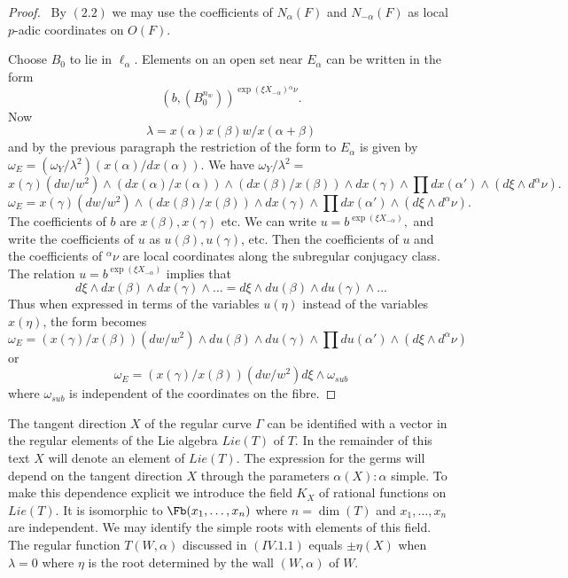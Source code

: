 \documentclass{memo-l}
\theoremstyle{definition}
\theoremstyle{remark}
\numberwithin{section}{chapter}
\numberwithin{equation}{chapter}
\begin{document}
\begin{proof} \ By $(2.2)$ we may use the coefficients of
$N_{{\alpha}}(F)$ and $N_{-{\alpha}}(F)$ as local $p$-adic coordinates on
$O(F)$.

   Choose $B_{0}$ to lie in ${\ell}_{{\alpha}}$.  Elements on an open set
near $E_{{\alpha}}$ can be written in the form 
$$(b,(B_{0}^{n_w}))^{\exp(\xi X_{-\alpha}){{}^\alpha\nu}}.$$   Now
$$
{\lambda}  =  x({\alpha})x({\beta})w/x({\alpha}+{\beta})
$$
and by the previous paragraph the restriction of the form to $E_{{\alpha}}$
is given by ${\omega}_{E}  = 
({\omega}_{Y}/{\lambda}^{2})(x({\alpha})/dx({\alpha}))$.  We have
${\omega}_{Y}/{\lambda}^{2}  = $
$$
x({\gamma})(dw/w^{2})\wedge (dx({\alpha})/x({\alpha}))\wedge
(dx({\beta})/x({\beta}))\wedge dx({\gamma})\wedge \prod 
dx({\alpha}')\wedge (d{\xi}\wedge d^{{\alpha}}{\nu}).
$$
$$
{\omega}_{E}  =  x({\gamma})(dw/w^{2})\wedge (dx({\beta})/x({\beta}))\wedge
dx({\gamma})\wedge \prod dx({\alpha}')\wedge (d{\xi}\wedge d^{{\alpha}}{\nu}).
$$
The coefficients of $b$ are $x({\beta}), x({\gamma})$ etc.  We can write $u
 =  b^{\exp({\xi}X_{-{\alpha}})},$ and write the coefficients of $u$ as
$u({\beta}), u({\gamma})$, etc.  Then the coefficients of $u$ and the
coefficients of $^{{\alpha}}{\nu}$ are local coordinates along the
subregular conjugacy class.  The relation $u = b^{\exp({\xi}X_{-{\alpha}})}$ 
implies that
$$
d{\xi}\wedge dx({\beta})\wedge dx({\gamma})\wedge \ldots =  d{\xi}\wedge
du({\beta})\wedge du({\gamma})\wedge \ldots
$$
Thus when expressed in terms of the variables $u({\eta})$ instead of the
variables $x({\eta})$, the form becomes
$$
{\omega}_{E}  =  (x({\gamma})/x({\beta}))(dw/w^{2})\wedge du({\beta})\wedge
du({\gamma})\wedge \prod du({\alpha}')\wedge (d{\xi}\wedge d^{{\alpha}}{\nu})
$$
or 
$$
{\omega}_{E}  =  (x({\gamma})/x({\beta}))(dw/w^{2})d{\xi}\wedge {\omega}_{sub}
$$
where ${\omega}_{sub}$ is independent of the coordinates on the fibre.
\end{proof} 
 

{\medskip}

   The tangent direction $X$ of the regular curve ${\Gamma}$ can be
identified with a vector in the regular elements of the Lie algebra
$Lie(T)$ of $T$.  In the remainder of this text  $X$ will denote an
element of $Lie(T)$.  The expression for the germs will depend on the
tangent direction $X$ through the parameters ${\alpha}(X) : {\alpha}$
simple.  To make this dependence explicit we introduce the 
field $K_X$ of rational functions on $Lie(T)$.
It is isomorphic to $\Fb (x_{1},\ldots
,x_{n})$ where $n  =  \dim(T)$ and $x_{1},\ldots ,x_{n}$ are independent.  
We may identify the simple roots with elements of this
field.  The regular function $T(W,{\alpha})$ discussed in $(IV.1.1)$ equals
${\pm}{\eta}(X)$ when ${\lambda} = 0$ where ${\eta}$ is the root
determined by the wall $(W,{\alpha})$ of $W$.
\end{document}
